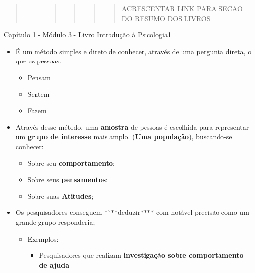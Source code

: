 \documentclass[
]{book}
\providecommand{\tightlist}{%
  \setlength{\itemsep}{0pt}\setlength{\parskip}{0pt}}
\begin{document}
\begin{quote}
\begin{quote}
\begin{quote}
\begin{quote}
\begin{quote}
\begin{quote}
ACRESCENTAR LINK PARA SECAO DO RESUMO DOS LIVROS
\end{quote}
\end{quote}
\end{quote}
\end{quote}
\end{quote}
\end{quote}

Capítulo 1 - Módulo 3 - Livro Introdução à Psicologia1

\begin{itemize}
\tightlist
\item
  É um método simples e direto de conhecer, através de uma pergunta
  direta, o que as pessoas:

  \begin{itemize}
  \tightlist
  \item
    Pensam
  \item
    Sentem
  \item
    Fazem
  \end{itemize}
\item
  Através desse método, uma \textbf{amostra} de pessoas é escolhida para
  representar um \textbf{grupo de interesse} mais amplo. (\textbf{Uma
  população}), buscando-se conhecer:

  \begin{itemize}
  \tightlist
  \item
    Sobre seu \textbf{comportamento};
  \item
    Sobre seus \textbf{pensamentos};
  \item
    Sobre suas \textbf{Atitudes};
  \end{itemize}
\item
  Os pesquisadores conseguem ****deduzir**** com notável precisão como
  um grande grupo responderia;

  \begin{itemize}
  \tightlist
  \item
    Exemplos:

    \begin{itemize}
    \tightlist
    \item
      Pesquisadores que realizam \textbf{investigação sobre
      comportamento de ajuda}


\end{itemize}
\end{itemize}
\end{itemize}
\end{document}
